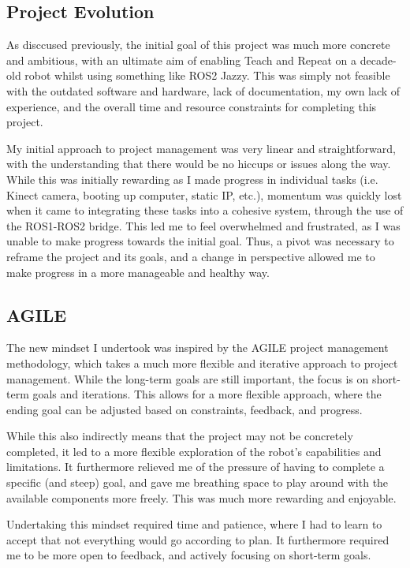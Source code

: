 \documentclass[a4paper, 12pt]{article}
\begin{document}
    \subsection{Project Evolution}

    As disccused previously, the initial goal of this project was much more concrete and ambitious, with an ultimate aim of enabling Teach and Repeat on a decade-old robot whilst using something like ROS2 Jazzy. This was simply not feasible with the outdated software and hardware, lack of documentation, my own lack of experience, and the overall time and resource constraints for completing this project. 
    
    My initial approach to project management was very linear and straightforward, with the understanding that there would be no hiccups or issues along the way. While this was initially rewarding as I made progress in individual tasks (i.e. Kinect camera, booting up computer, static IP, etc.), momentum was quickly lost when it came to integrating these tasks into a cohesive system, through the use of the ROS1-ROS2 bridge. This led me to feel overwhelmed and frustrated, as I was unable to make progress towards the initial goal. Thus, a pivot was necessary to reframe the project and its goals, and a change in perspective allowed me to make progress in a more manageable and healthy way.

    \subsection{AGILE}

    The new mindset I undertook was inspired by the AGILE project management methodology, which takes a much more flexible and iterative approach to project management. While the long-term goals are still important, the focus is on short-term goals and iterations. This allows for a more flexible approach, where the ending goal can be adjusted based on constraints, feedback, and progress. 

    While this also indirectly means that the project may not be concretely completed, it led to a more flexible exploration of the robot's capabilities and limitations. It furthermore relieved me of the pressure of having to complete a specific (and steep) goal, and gave me breathing space to play around with the available components more freely. This was much more rewarding and enjoyable.

    Undertaking this mindset required time and patience, where I had to learn to accept that not everything would go according to plan. It furthermore required me to be more open to feedback, and actively focusing on short-term goals. 
\end{document}
